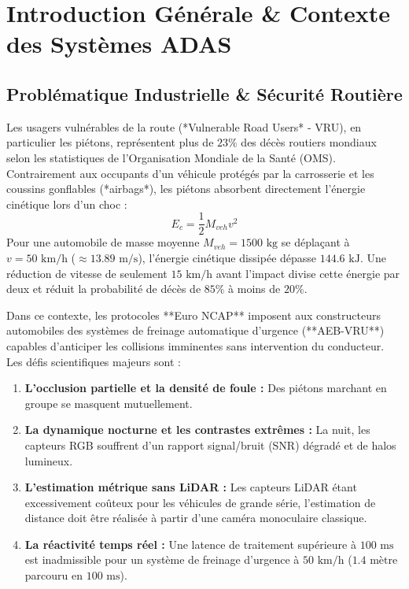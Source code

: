 \documentclass[11pt,a4paper]{article}
\begin{document}
\section{Introduction Générale \& Contexte des Systèmes ADAS}

\subsection{Problématique Industrielle \& Sécurité Routière}
Les usagers vulnérables de la route (*Vulnerable Road Users* - VRU), en particulier les piétons, représentent plus de $23\%$ des décès routiers mondiaux selon les statistiques de l'Organisation Mondiale de la Santé (OMS). Contrairement aux occupants d'un véhicule protégés par la carrosserie et les coussins gonflables (*airbags*), les piétons absorbent directement l'énergie cinétique lors d'un choc :
\begin{equation}
    E_c = \frac{1}{2} M_{veh} v^2
\end{equation}
Pour une automobile de masse moyenne $M_{veh} = 1500\text{ kg}$ se déplaçant à $v = 50\text{ km/h}$ ($\approx 13.89\text{ m/s}$), l'énergie cinétique dissipée dépasse $144.6\text{ kJ}$. Une réduction de vitesse de seulement $15\text{ km/h}$ avant l'impact divise cette énergie par deux et réduit la probabilité de décès de $85\%$ à moins de $20\%$.

Dans ce contexte, les protocoles **Euro NCAP** imposent aux constructeurs automobiles des systèmes de freinage automatique d'urgence (**AEB-VRU**) capables d'anticiper les collisions imminentes sans intervention du conducteur. Les défis scientifiques majeurs sont :
\begin{enumerate}
    \item \textbf{L'occlusion partielle et la densité de foule :} Des piétons marchant en groupe se masquent mutuellement.
    \item \textbf{La dynamique nocturne et les contrastes extrêmes :} La nuit, les capteurs RGB souffrent d'un rapport signal/bruit (SNR) dégradé et de halos lumineux.
    \item \textbf{L'estimation métrique sans LiDAR :} Les capteurs LiDAR étant excessivement coûteux pour les véhicules de grande série, l'estimation de distance doit être réalisée à partir d'une caméra monoculaire classique.
    \item \textbf{La réactivité temps réel :} Une latence de traitement supérieure à $100\text{ ms}$ est inadmissible pour un système de freinage d'urgence à $50\text{ km/h}$ ($1.4\text{ mètre}$ parcouru en $100\text{ ms}$).
\end{enumerate}
\end{document}
